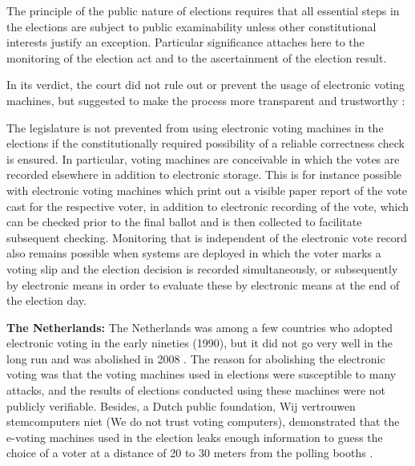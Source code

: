   \begin{displayquote}
  The principle of the public nature of elections requires that all 
  essential steps in the elections are subject to public examinability
  unless other constitutional interests justify an exception. 
  Particular significance attaches here to the monitoring of the 
  election act and to the ascertainment of the election result.
  \end{displayquote}
  
 
 
  \noindent	
  In its verdict, the court did not rule out or prevent the usage of electronic 
  voting machines,  but suggested to make the process more 
  transparent and trustworthy \citep{Germanconst}:
  
  \begin{displayquote}
  The legislature is not prevented from using electronic voting machines 
  in the elections if the constitutionally required possibility of a 
  reliable correctness check is ensured. In particular, voting machines 
  are conceivable in which the votes are recorded elsewhere in addition
   to electronic storage. This is for instance possible with electronic
   voting machines which print out a visible paper report of the vote 
   cast for the respective voter, in addition to electronic recording 
   of the vote, which can be checked prior to the final ballot and is
    then collected to facilitate subsequent checking. Monitoring that is
     independent of the electronic vote record also remains possible when
     systems are deployed in which the voter marks a voting slip and the 
     election decision is recorded simultaneously, 
     or subsequently by electronic means in 
     order to evaluate these by electronic means at the end of the 
     election day.
     \end{displayquote}
  
  \textbf{The Netherlands:}
  The Netherlands was among a few countries who adopted electronic voting 
  in the early nineties (1990), but it did not go very well in the long 
  run and was abolished in 2008 \citep{Jacobs2009}. 
  The reason for abolishing the electronic voting was that   
  the voting machines used in elections were susceptible to many attacks,
  and the results of elections conducted using these machines 
  were not publicly verifiable.  Besides, a Dutch public foundation, Wij vertrouwen stemcomputers niet
  (We do not trust voting computers), demonstrated that the e-voting machines 
  used in the election leaks enough information to guess the choice of a voter 
  at a distance of 20 to 30 meters from 
  the polling booths  \citep{NetherlandsYouTube}.
  
